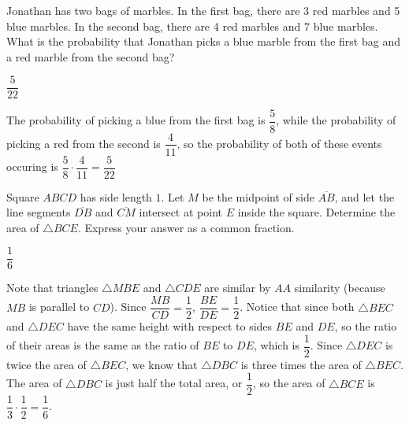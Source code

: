 \documentclass{article}
\begin{document}
\begin{problem}
Jonathan has two bags of marbles. In the first bag, there are 3 red marbles and 5 blue marbles. In the second bag, there are 4 red marbles and 7 blue marbles. What is the probability that Jonathan picks a blue marble from the first bag and a red marble from the second bag?
\end{problem}
\begin{answer}
$\dfrac{5}{22}$
\end{answer}
\begin{solution}
The probability of picking a blue from the first bag is $\dfrac{5}{8}$, while the probability of picking a red from the second is $\dfrac{4}{11}$, so the probability of both of these events occuring is $\dfrac{5}{8} \cdot \dfrac{4}{11} = \boxed{\dfrac{5}{22}}$
\end{solution}




\begin{problem}
Square $ABCD$ has side length $1$. Let $M$ be the midpoint of side $\overline{AB}$, and let the line segments $\overline{DB}$ and $\overline{CM}$ intersect at point $E$ inside the square. Determine the area of $\triangle BCE$. Express your answer as a common fraction.
\end{problem}

\begin{answer}
$\dfrac{1}{6}$
\end{answer}

\begin{solution}
Note that triangles $\triangle MBE$ and $\triangle CDE$ are similar by $AA$ similarity (because $MB$ is parallel to $CD$). Since $\dfrac{MB}{CD} = \dfrac{1}{2}$, $\dfrac{BE}{DE} = \dfrac{1}{2}$. Notice that since both $\triangle BEC$ and $\triangle DEC$ have the same height with respect to sides $BE$ and $DE$, so the ratio of their areas is the same as the ratio of $BE$ to $DE$, which is $\dfrac12$. Since $\triangle DEC$ is twice the area of $\triangle BEC$, we know that $\triangle DBC$ is three times the area of $\triangle BEC$. The area of $\triangle DBC$ is just half the total area, or $\dfrac{1}{2}$, so the area of $\triangle BCE$ is $\dfrac{1}{3} \cdot \dfrac{1}{2} = \boxed{\dfrac{1}{6}}$.
\end{solution}
\end{document}
